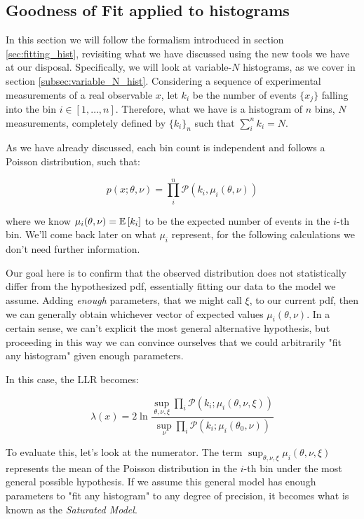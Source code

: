 \subsection{Goodness of Fit applied to histograms}
In this section we will follow the formalism introduced in section \ref{sec:fitting_hist}, revisiting what we have discussed using the new tools we have at our disposal. Specifically, we will look at variable-$N$ histograms, as we cover in section \ref{subsec:variable_N_hist}.
Considering a sequence of experimental measurements of a real observable $x$, let $k_i$ be the number of events $\{x_j\}$ falling into the bin $i\in \left[1,\dots,n\right]$. Therefore, what we have is a histogram of $n$ bins, $N$ measurements, completely defined by $\{k_i\}_n$ such that $\sum_i^n k_i =N$.

As we have already discussed, each bin count is independent and follows a Poisson distribution, such that:

	\[
	p(x;\theta, \nu) = \prod_i^n \mathcal{P}\left(k_i,\mu_i(\theta,\nu)\right)
	\]
	
where we know $\mu_i(\theta,\nu)=\mathbb{E}\left[k_i\right]$ to be the expected number of events in the $i$-th bin. We'll come back later on what $\mu_i$ represent, for the following calculations we don't need further information.


Our goal here is to confirm that the observed distribution does not statistically differ from the hypothesized pdf, essentially fitting our data to the model we assume. Adding \emph{enough} parameters, that we might call $\xi$, to our current pdf, then we can generally obtain whichever vector of expected values $\mu_i(\theta,\nu)$. In a certain sense, we can't explicit the most general alternative hypothesis, but proceeding in this way we can convince ourselves that we could arbitrarily "fit any histogram" given enough parameters.

In this case, the LLR becomes:

	\[
	\lambda(x) = 2\ln\frac{\sup_{\theta,\nu, \xi}\prod_i\mathcal{P}\left(k_i;\mu_i(\theta,\nu,\xi)\right)}{\sup_\nu\prod_i\mathcal{P}\left(k_i;\mu_i(\theta_0,\nu)\right)}
	\]

To evaluate this, let's look at the numerator. The term $\sup_{\theta,\nu,\xi}\mu_i(\theta,\nu,\xi)$ represents the mean of the Poisson distribution in the $i$-th bin under the most general possible hypothesis. If we assume this general model has enough parameters to "fit any histogram" to any degree of precision, it becomes what is known as the \emph{Saturated Model}. 

